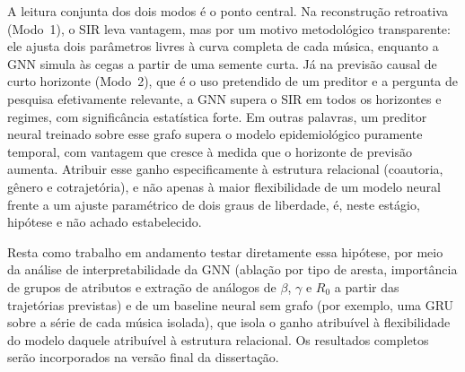 A leitura conjunta dos dois modos é o ponto central. Na reconstrução retroativa (Modo~1), o SIR leva vantagem, mas por um motivo metodológico transparente: ele ajusta dois parâmetros livres à curva completa de cada música, enquanto a GNN simula às cegas a partir de uma semente curta. Já na previsão causal de curto horizonte (Modo~2), que é o uso pretendido de um preditor e a pergunta de pesquisa efetivamente relevante, a GNN supera o SIR em todos os horizontes e regimes, com significância estatística forte. Em outras palavras, um preditor neural treinado sobre esse grafo supera o modelo epidemiológico puramente temporal, com vantagem que cresce à medida que o horizonte de previsão aumenta. Atribuir esse ganho especificamente à estrutura relacional (coautoria, gênero e cotrajetória), e não apenas à maior flexibilidade de um modelo neural frente a um ajuste paramétrico de dois graus de liberdade, é, neste estágio, hipótese e não achado estabelecido.

Resta como trabalho em andamento testar diretamente essa hipótese, por meio da análise de interpretabilidade da GNN (ablação por tipo de aresta, importância de grupos de atributos e extração de análogos de $\beta$, $\gamma$ e $R_0$ a partir das trajetórias previstas) e de um baseline neural sem grafo (por exemplo, uma GRU sobre a série de cada música isolada), que isola o ganho atribuível à flexibilidade do modelo daquele atribuível à estrutura relacional. Os resultados completos serão incorporados na versão final da dissertação.
